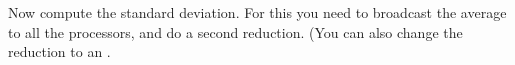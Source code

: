   Now compute the standard deviation. For this you need to broadcast
  the average to all the processors, and do a second reduction. (You
  can also change the reduction to an .
